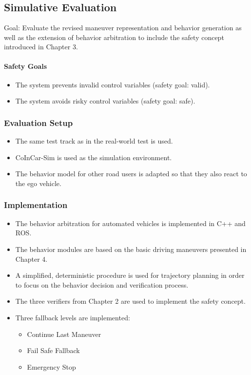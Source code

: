 \subsection{Simulative Evaluation}

Goal: Evaluate the revised maneuver representation and behavior generation as well as the extension of behavior arbitration to include the safety concept introduced in Chapter 3.

\paragraph*{Safety Goals}

\begin{itemize}
    \item The system prevents invalid control variables (safety goal: valid).
    \item The system avoids risky control variables (safety goal: safe).
\end{itemize}

\subsubsection*{Evaluation Setup}

\begin{itemize}
    \item The same test track as in the real-world test is used.
    \item CoInCar-Sim is used as the simulation environment.
    \item The behavior model for other road users is adapted so that they also react to the ego vehicle.
\end{itemize}

\subsubsection*{Implementation}

\begin{itemize}
    \item The behavior arbitration for automated vehicles is implemented in C++ and ROS.
    \item The behavior modules are based on the basic driving maneuvers presented in Chapter 4.
    \item A simplified, deterministic procedure is used for trajectory planning in order to focus on the behavior decision and verification process.
    \item The three verifiers from Chapter 2 are used to implement the safety concept.
    \item Three fallback levels are implemented:
          \begin{itemize}
              \item Continue Last Maneuver
              \item Fail Safe Fallback
              \item Emergency Stop
          \end{itemize}
\end{itemize}

